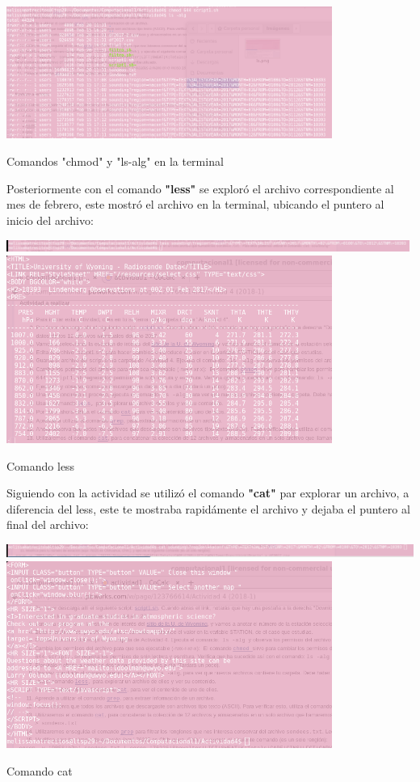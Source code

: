 \documentclass{article}
\begin{document}
\begin{center}
  \includegraphics[width=0.8\textwidth]{chmod.png}

Comandos "chmod" y "ls-alg" en la terminal

\end{center}

Posteriormente con el comando \textbf{"less"} se exploró el archivo correspondiente al mes de febrero, este mostró el archivo en la terminal, ubicando el puntero al inicio del archivo:

\begin{center}

 \includegraphics[width=0.99\textwidth]{less2.PNG}
 \includegraphics[width=0.8\textwidth]{less1.png}

Comando less

\end{center}

Siguiendo con la actividad se utilizó el comando \textbf{"cat"} par explorar un archivo, a diferencia del less, este te mostraba rapidámente el archivo y dejaba el puntero al final del archivo:
\begin{center}
 \includegraphics[width=1\textwidth]{cat1.PNG}
 \includegraphics[width=0.8\textwidth]{cat2.png}

Comando cat

\end{center}
\end{document}
